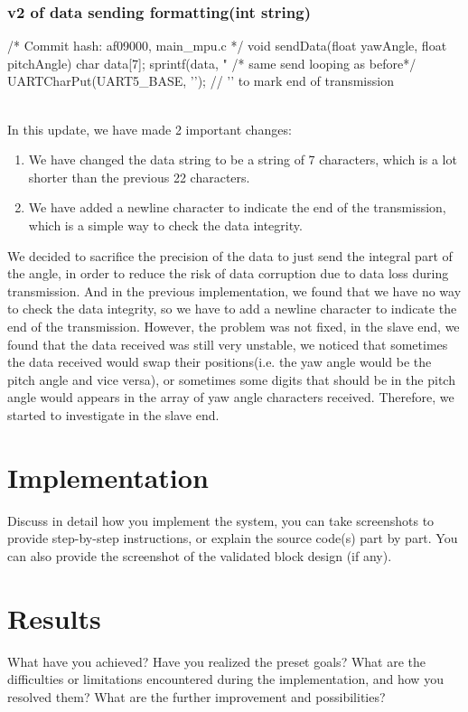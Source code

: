 \documentclass[12pt, a4paper]{article}
\begin{document}
\subsubsection{v2 of data sending formatting(int string)}\text{}
\begin{code}
/* Commit hash: af09000, main_mpu.c */
void sendData(float yawAngle, float pitchAngle) {
    char data[7]; 
    sprintf(data, "%
    /* same send looping as before*/
    UARTCharPut(UART5_BASE, '\n'); // '\n' to mark end of transmission
}
\end{code}
\textbf{}\\
In this update, we have made 2 important changes:
\begin{enumerate}
    \item We have changed the data string to be a string of 7 characters, which is a lot shorter than the previous 22 characters.
    \item We have added a newline character to indicate the end of the transmission, which is a simple way to check the data integrity.
\end{enumerate}
We decided to sacrifice the precision of the data to just send the integral part of the angle, 
in order to reduce the risk of data corruption due to data loss during transmission. 
And in the previous implementation, we found that we have no way to check the data integrity, 
so we have to add a newline character to indicate the end of the transmission.
However, the problem was not fixed, in the slave end, we found that the data received was still very unstable, 
we noticed that sometimes the data received would swap their positions(i.e. the yaw angle would be the pitch angle and vice versa), 
or sometimes some digits that should be in the pitch angle would appears in the array of yaw angle characters received.
Therefore, we started to investigate in the slave end.

\section{Implementation}
Discuss in detail how you implement the system, you can take
screenshots to provide step-by-step instructions, or explain the source
code(s) part by part. You can also provide the screenshot of the
validated block design (if any).

\section{Results}
What have you achieved? Have you realized the preset goals?
What are the difficulties or limitations encountered during the
implementation, and how you resolved them?
What are the further improvement and possibilities?
\end{document}
